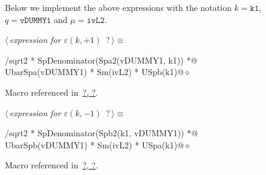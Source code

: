 \documentclass[a4paper,12pt]{amsart}
\renewcommand{\NWtarget}[2]{\hypertarget{#1}{#2}}
\renewcommand{\NWlink}[2]{\hyperlink{#1}{#2}}
\renewcommand{\NWtxtMacroRefIn}{Macro referenced in}
\renewcommand{\NWsep}{${\diamond}$}
\begin{document}
Below we implement the above expressions with the notation
$k=\mathtt{k1}$, $q=\mathtt{vDUMMY1}$ and $\mu=\mathtt{ivL2}$.
\begin{flushleft} \small
\begin{minipage}{\linewidth}\label{scrap19}\raggedright\small
\NWtarget{nuweb?}{} $\langle\,${\it expression for $\varepsilon(k, +1)$}\nobreak\ {\footnotesize {?}}$\,\rangle\equiv$
\vspace{-1ex}
\begin{list}{}{} \item
\mbox{}/sqrt2 * SpDenominator(Spa2(vDUMMY1, k1)) *@\\
\mbox{}\verb@        UbarSpa(vDUMMY1) * Sm(ivL2) * USpb(k1)@{\NWsep}
\end{list}
\vspace{-1.5ex}
\footnotesize
\begin{list}{}{\setlength{\itemsep}{-\parsep}\setlength{\itemindent}{-\leftmargin}}
\item \NWtxtMacroRefIn\ \NWlink{nuweb?}{?}\NWlink{nuweb?}{, ?}.

\item{}
\end{list}
\end{minipage}\vspace{4ex}
\end{flushleft}
\begin{flushleft} \small
\begin{minipage}{\linewidth}\label{scrap20}\raggedright\small
\NWtarget{nuweb?}{} $\langle\,${\it expression for $\varepsilon(k, -1)$}\nobreak\ {\footnotesize {?}}$\,\rangle\equiv$
\vspace{-1ex}
\begin{list}{}{} \item
\mbox{}/sqrt2 * SpDenominator(Spb2(k1, vDUMMY1)) *@\\
\mbox{}\verb@        UbarSpb(vDUMMY1) * Sm(ivL2) * USpa(k1)@{\NWsep}
\end{list}
\vspace{-1.5ex}
\footnotesize
\begin{list}{}{\setlength{\itemsep}{-\parsep}\setlength{\itemindent}{-\leftmargin}}
\item \NWtxtMacroRefIn\ \NWlink{nuweb?}{?}\NWlink{nuweb?}{, ?}.

\item{}
\end{list}
\end{minipage}\vspace{4ex}
\end{flushleft}
\end{document}
